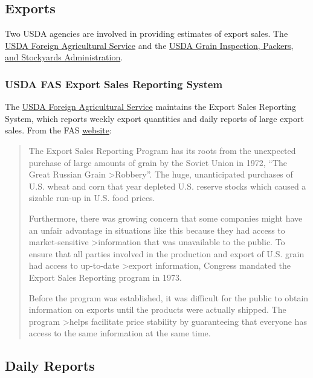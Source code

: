 \documentclass[]{book}
\theoremstyle{definition}
\theoremstyle{definition}
\theoremstyle{remark}
\begin{document}
\subsection{Exports}\label{exports-1}

Two USDA agencies are involved in providing estimates of export sales.
The \href{http://www.fas.usda.gov/}{USDA Foreign Agricultural Service}
and the \href{http://www.gipsa.usda.gov/}{USDA Grain Inspection,
Packers, and Stockyards Administration}.

\subsubsection{USDA FAS Export Sales Reporting
System}\label{usda-fas-export-sales-reporting-system}

The \href{http://www.fas.usda.gov/}{USDA Foreign Agricultural Service}
maintains the Export Sales Reporting System, which reports weekly export
quantities and daily reports of large export sales. From the FAS
\href{https://apps.fas.usda.gov/export-sales/FACT\%20SHEET.pdf}{website}:

\begin{quote}
The Export Sales Reporting Program has its roots from the unexpected
purchase of large amounts of grain by the Soviet Union in 1972, ``The
Great Russian Grain \textgreater{}Robbery''. The huge, unanticipated
purchases of U.S. wheat and corn that year depleted U.S. reserve stocks
which caused a sizable run-up in U.S. food prices.

Furthermore, there was growing concern that some companies might have an
unfair advantage in situations like this because they had access to
market-sensitive \textgreater{}information that was unavailable to the
public. To ensure that all parties involved in the production and export
of U.S. grain had access to up-to-date \textgreater{}export information,
Congress mandated the Export Sales Reporting program in 1973.

Before the program was established, it was difficult for the public to
obtain information on exports until the products were actually shipped.
The program \textgreater{}helps facilitate price stability by
guaranteeing that everyone has access to the same information at the
same time.
\end{quote}

\subsection{Daily Reports}\label{daily-reports}
\end{document}
